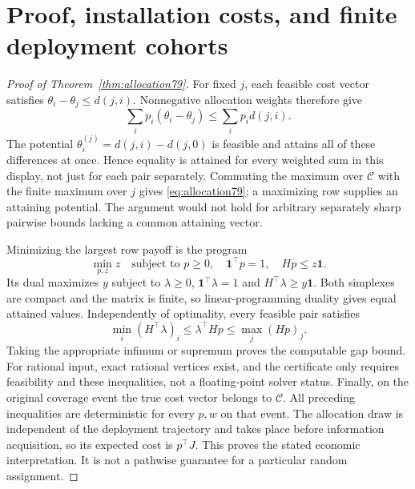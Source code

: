 \section{Proof, installation costs, and finite deployment cohorts}\label{app:allocation79}
\begin{proof}[Proof of Theorem~\ref{thm:allocation79}]
For fixed $j$, each feasible cost vector satisfies $\theta_i-\theta_j\le d(j,i)$. Nonnegative allocation weights therefore give
\[
 \sum_i p_i(\theta_i-\theta_j)\le\sum_i p_i d(j,i).
\]
The potential $\theta_i^{(j)}=d(j,i)-d(j,0)$ is feasible and attains all of these differences at once. Hence equality is attained for every weighted sum in this display, not just for each pair separately. Commuting the maximum over $\mathcal C$ with the finite maximum over $j$ gives \eqref{eq:allocation79}; a maximizing row supplies an attaining potential. The argument would not hold for arbitrary separately sharp pairwise bounds lacking a common attaining vector.

Minimizing the largest row payoff is the program
\[
 \min_{p,z}z\quad\text{subject to }p\ge0,\quad\boldsymbol1^\top p=1,
 \quad H p\le z\boldsymbol1.
\]
Its dual maximizes $y$ subject to $\lambda\ge0$, $\boldsymbol1^\top\lambda=1$ and $H^\top\lambda\ge y\boldsymbol1$. Both simplexes are compact and the matrix is finite, so linear-programming duality gives equal attained values. Independently of optimality, every feasible pair satisfies
\[
 \min_i(H^\top\lambda)_i\le\lambda^\top H p
                       \le\max_j(Hp)_j.
\]
Taking the appropriate infimum or supremum proves the computable gap bound. For rational input, exact rational vertices exist, and the certificate only requires feasibility and these inequalities, not a floating-point solver status. Finally, on the original coverage event the true cost vector belongs to $\mathcal C$. All preceding inequalities are deterministic for every $p,w$ on that event. The allocation draw is independent of the deployment trajectory and takes place before information acquisition, so its expected cost is $p^\top J$. This proves the stated economic interpretation. It is not a pathwise guarantee for a particular random assignment.
\end{proof}

